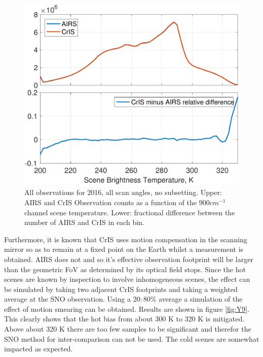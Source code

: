\documentclass[twocolumn,10pt]{article}
\begin{document}
\begin{figure}[htb]
\centering
\includegraphics[width=\linewidth]{./figs/full_scan_land_2016_all_mod.pdf}
\caption{
  All observations for 2016, all scan angles, no subsetting. Upper: AIRS and CrIS Observation counts as a function of the $900 cm^{-1}$ channel scene temperature. Lower: fractional difference between the number of AIRS and CrIS in each bin.}
\label{fig:Y8}
\end{figure}

Furthermore, it is known that CrIS uses motion compensation in the scanning mirror so as to remain at a fixed point on the Earth whilst a measurement is obtained. AIRS does not and so it's effective observation footprint will be larger than the geometric FoV as determined by its optical field stops. Since the hot scenes are known by inspection to involve inhomogeneous scenes, the effect can be simulated by taking two adjacent CrIS footprints and taking a weighted average at the SNO observation. Using a $20:80 \% $ average a simulation of the effect of motion smearing can be obtained. Results are shown in figure \ref{fig:Y9}. This clearly shows that the hot bias from about 300 K to 320 K is mitigated. Above about 320 K there are too few samples to be significant and therefor the SNO method for inter-comparison can not be used. The cold scenes are somewhat impacted as expected.
\end{document}
